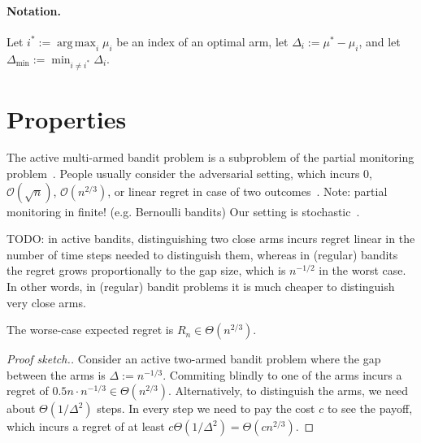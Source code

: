 \documentclass[a4paper]{article}
\DeclareMathOperator*{\argmax}{arg\,max} %
\begin{document}
\paragraph{Notation.}
Let $i^* := \argmax_i \mu_i$ be an index of an optimal arm,
let $\Delta_i := \mu^* - \mu_i$, and
let $\Delta_{\min} := \min_{i \neq i^*} \Delta_i$.



\section{Properties}

The active multi-armed bandit problem is
a subproblem of the partial monitoring problem~\citep{Piccolboni01}.
People usually consider the adversarial setting,
which incurs $0$, $\mathcal{O}(\sqrt{n})$, $\mathcal{O}(n^{2/3})$, or linear regret in case of two outcomes~\citep{Antos13}.
Note: partial monitoring in finite! (e.g. Bernoulli bandits)
Our setting is stochastic~\citep{Komiyama15}.

TODO: in active bandits, distinguishing two close arms incurs regret linear in the number of time steps needed to distinguish them, whereas in (regular) bandits the regret grows proportionally to the gap size, which is $n^{-1/2}$ in the worst case.
In other words, in (regular) bandit problems it is much cheaper
to distinguish very close arms.

\begin{proposition}
The worse-case expected regret is $R_n \in \Theta(n^{2/3})$.
\end{proposition}
\begin{proof}[Proof sketch.]
Consider an active two-armed bandit problem
where the gap between the arms is $\Delta := n^{-1/3}$.
Commiting blindly to one of the arms incurs a regret of
$0.5n \cdot n^{-1/3} \in \Theta(n^{2/3})$.
Alternatively, to distinguish the arms,
we need about $\Theta(1/\Delta^2)$ steps.
In every step we need to pay the cost $c$ to see the payoff,
which incurs a regret of
at least $c\Theta(1/\Delta^2) = \Theta(cn^{2/3})$.
\end{proof}
\end{document}
